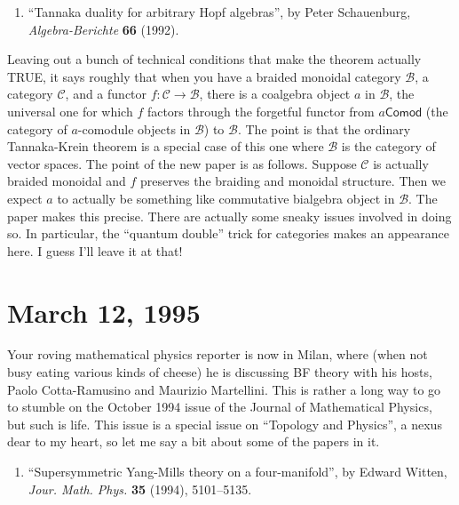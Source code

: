 \documentclass{article}
\def\tightlist{}
\begin{document}
\begin{enumerate}
\def\labelenumi{\arabic{enumi})}
\setcounter{enumi}{4}
\tightlist
\item
  ``Tannaka duality for arbitrary Hopf algebras'', by Peter Schauenburg,
  \emph{Algebra-Berichte} \textbf{66} (1992).
\end{enumerate}

Leaving out a bunch of technical conditions that make the theorem
actually TRUE, it says roughly that when you have a braided monoidal
category \(\mathcal{B}\), a category \(\mathcal{C}\), and a functor
\(f\colon \mathcal{C} \to \mathcal{B}\), there is a coalgebra object
\(a\) in \(\mathcal{B}\), the universal one for which \(f\) factors
through the forgetful functor from \(a\mathsf{Comod}\) (the category of
\(a\)-comodule objects in \(\mathcal{B}\)) to \(\mathcal{B}\). The point
is that the ordinary Tannaka-Krein theorem is a special case of this one
where \(\mathcal{B}\) is the category of vector spaces. The point of the
new paper is as follows. Suppose \(\mathcal{C}\) is actually braided
monoidal and \(f\) preserves the braiding and monoidal structure. Then
we expect \(a\) to actually be something like commutative bialgebra
object in \(\mathcal{B}\). The paper makes this precise. There are
actually some sneaky issues involved in doing so. In particular, the
``quantum double'' trick for categories makes an appearance here. I
guess I'll leave it at that!
\hypertarget{week50}{%
\section{March 12, 1995}\label{week50}}

Your roving mathematical physics reporter is now in Milan, where (when
not busy eating various kinds of cheese) he is discussing BF theory with
his hosts, Paolo Cotta-Ramusino and Maurizio Martellini. This is rather
a long way to go to stumble on the October 1994 issue of the Journal of
Mathematical Physics, but such is life. This issue is a special issue on
``Topology and Physics'', a nexus dear to my heart, so let me say a bit
about some of the papers in it.

\begin{enumerate}
\def\labelenumi{\arabic{enumi})}
\tightlist
\item
  ``Supersymmetric Yang-Mills theory on a four-manifold'', by Edward
  Witten, \emph{Jour. Math. Phys.} \textbf{35} (1994), 5101--5135.
\end{enumerate}
\end{document}
